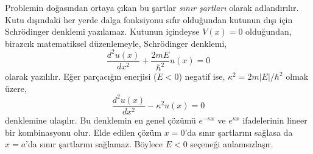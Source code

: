 \documentclass[a4paper,12pt, twoside]{article}
\begin{document}
Problemin doğasından ortaya çıkan bu şartlar \emph{sınır şartları} olarak adlandırılır. Kutu dışındaki her yerde dalga fonksiyonu sıfır olduğundan kutunun dışı için Schrödinger denklemi yazılamaz. Kutunun içindeyse $V(x)=0$ olduğundan, birazcık matematiksel düzenlemeyle, Schrödinger denklemi,
\begin{equation}
\frac { d ^ { 2 } u ( x ) } { d x ^ { 2 } } + \frac { 2 m E } { \hbar ^ { 2 } } u ( x ) = 0
\label{eq:infinite_well_schrodinger}
\end{equation}
olarak yazılılır. Eğer parçacığın enerjisi ($E<0$) negatif ise, $\kappa ^ { 2 } = 2 m | E | / \hbar ^ { 2 }$ olmak üzere,
\begin{equation}
\frac { d ^ { 2 } u ( x ) } { d x ^ { 2 } } - \kappa ^ { 2 } u ( x ) = 0
\end{equation}
denklemine ulaşılır. Bu denklemin en genel çözümü $e ^ { - \kappa x }$ ve $e ^ {\kappa x }$ ifadelerinin lineer bir kombinasyonu olur. Elde edilen çözüm $x=0$'da sınır şartlarını sağlasa da $x=a$'da sınır şartlarını sağlamaz. Böylece $E<0$ seçeneği anlamsızlaşır.
\end{document}
